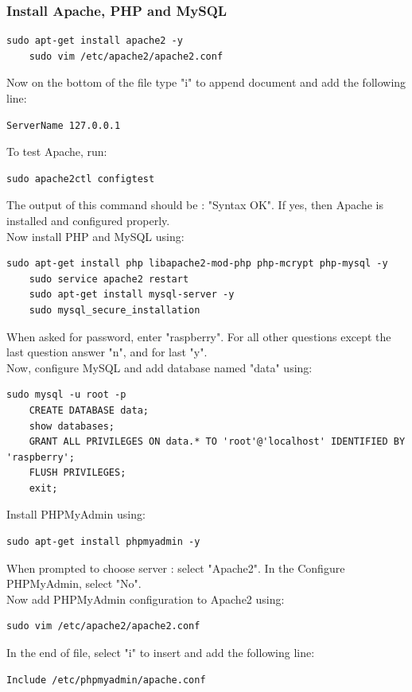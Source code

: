 \documentclass{article}
\begin{document}
\subsubsection*{Install Apache, PHP and MySQL}
\begin{lstlisting}[style=BashInputStyle]
    sudo apt-get install apache2 -y
    sudo vim /etc/apache2/apache2.conf
\end{lstlisting}
Now on the bottom of the file type "i" to append document and add the following line:
\begin{lstlisting}[style=BashInputStyle]
    ServerName 127.0.0.1
\end{lstlisting}
To test Apache, run:
\begin{lstlisting}[style=BashInputStyle]
    sudo apache2ctl configtest
\end{lstlisting}
The output of this command should be : "Syntax OK". If yes, then Apache is installed and configured properly. \\Now install PHP and MySQL using:
\begin{lstlisting}[style=BashInputStyle]
    sudo apt-get install php libapache2-mod-php php-mcrypt php-mysql -y
    sudo service apache2 restart
    sudo apt-get install mysql-server -y
    sudo mysql_secure_installation
\end{lstlisting}
When asked for password, enter "raspberry". For all other questions except the last question answer "n", and for last "y".\\
Now, configure MySQL and add database named "data" using:
\begin{lstlisting}[style=BashInputStyle]
    sudo mysql -u root -p
    CREATE DATABASE data;
    show databases;
    GRANT ALL PRIVILEGES ON data.* TO 'root'@'localhost' IDENTIFIED BY 'raspberry';
    FLUSH PRIVILEGES;
    exit;
\end{lstlisting}
Install PHPMyAdmin using:
\begin{lstlisting}[style=BashInputStyle]
    sudo apt-get install phpmyadmin -y
\end{lstlisting}
When prompted to choose server : select "Apache2". In the Configure PHPMyAdmin, select "No".\\ Now add PHPMyAdmin configuration to Apache2 using:
\begin{lstlisting}[style=BashInputStyle]
    sudo vim /etc/apache2/apache2.conf
\end{lstlisting}
In the end of file, select "i" to insert and add the following line:
\begin{lstlisting}[style=BashInputStyle]
    Include /etc/phpmyadmin/apache.conf
\end{lstlisting}
\end{document}
